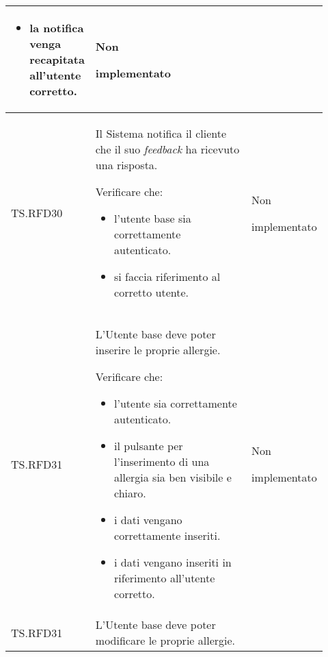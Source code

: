 \begin{longtable}{|p{0.10\linewidth}|p{0.70\linewidth}|p{0.12\linewidth}|}
\begin{itemize}
		\item la notifica venga recapitata all'utente corretto.
	\end{itemize}                                         &
	Non \par implementato                                                                                                                                                   \\
	\hline
	TS.RFD30                                                                                                                        &
	Il Sistema notifica il cliente che il suo \textit{feedback} ha ricevuto una risposta. \par
	Verificare che:
	\begin{itemize}
		\item l'utente base sia correttamente autenticato.
		\item si faccia riferimento al corretto utente.
	\end{itemize}                                                                              &
	Non \par implementato                                                                                                                                                   \\
	\hline
	TS.RFD31                                                                                                                        &
	L’Utente base deve poter inserire le proprie allergie. \par
	Verificare che:
	\begin{itemize}
		\item l'utente sia correttamente autenticato.
		\item il pulsante per l'inserimento di una allergia sia ben visibile e chiaro.
		\item i dati vengano correttamente inseriti.
		\item i dati vengano inseriti in riferimento all'utente corretto.
	\end{itemize}                                                  &
	Non \par implementato                                                                                                                                                   \\
	\hline
	TS.RFD31                                                                                                                        &
	L’Utente base deve poter modificare le proprie allergie. \par

\end{longtable}
